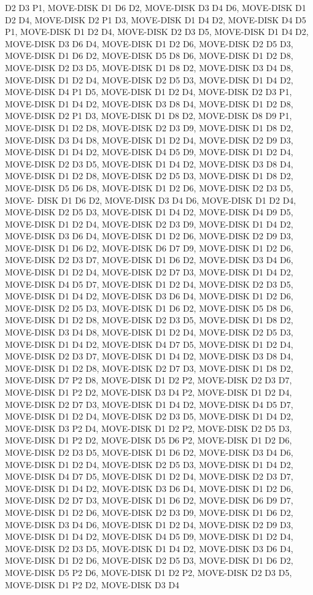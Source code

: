 \documentclass[12pt]{article}
\begin{document}
\begin{appendix}
\begin{itemize}
D2 D3 P1,  MOVE-DISK D1 D6 D2,  MOVE-DISK D3 D4 D6,  MOVE-DISK D1 D2 D4,  MOVE-DISK D2 P1 D3,  MOVE-DISK D1 D4 D2,  MOVE-DISK D4 D5 P1,  MOVE-DISK D1 D2 D4,  MOVE-DISK D2 D3 D5,  MOVE-DISK D1 D4 D2,  MOVE-DISK D3 D6 D4,  MOVE-DISK D1 D2 D6,  MOVE-DISK D2 D5 D3,  MOVE-DISK D1 D6 D2,  MOVE-DISK D5 D8 D6,  MOVE-DISK D1 D2 D8,  MOVE-DISK D2 D3 D5,  MOVE-DISK D1 D8 D2,  MOVE-DISK D3 D4 D8,  MOVE-DISK D1 D2 D4,  MOVE-DISK D2 D5 D3,  MOVE-DISK D1 D4 D2,  MOVE-DISK D4 P1 D5,  MOVE-DISK D1 D2 D4,  MOVE-DISK D2 D3 P1,  MOVE-DISK D1 D4 D2,  MOVE-DISK D3 D8 D4,  MOVE-DISK D1 D2 D8,  MOVE-DISK D2 P1 D3,  MOVE-DISK D1 D8 D2,  MOVE-DISK D8 D9 P1,  MOVE-DISK D1 D2 D8,  MOVE-DISK D2 D3 D9,  MOVE-DISK D1 D8 D2,  MOVE-DISK D3 D4 D8,  MOVE-DISK D1 D2 D4,  MOVE-DISK D2 D9 D3,  MOVE-DISK D1 D4 D2,  MOVE-DISK D4 D5 D9,  MOVE-DISK D1 D2 D4,  MOVE-DISK D2 D3 D5,  MOVE-DISK D1 D4 D2,  MOVE-DISK D3 D8 D4,  MOVE-DISK D1 D2 D8,  MOVE-DISK D2 D5 D3,  MOVE-DISK D1 D8 D2,  MOVE-DISK D5 D6 D8,  MOVE-DISK D1 D2 D6,  MOVE-DISK D2 D3 D5,  MOVE-
DISK D1 D6 D2,  MOVE-DISK D3 D4 D6,  MOVE-DISK D1 D2 D4,  MOVE-DISK D2 D5 D3,  MOVE-DISK D1 D4 D2,  MOVE-DISK D4 D9 D5,  MOVE-DISK D1 D2 D4,  MOVE-DISK D2 D3 D9,  MOVE-DISK D1 D4 D2,  MOVE-DISK D3 D6 D4,  MOVE-DISK D1 D2 D6,  MOVE-DISK D2 D9 D3,  MOVE-DISK D1 D6 D2,  MOVE-DISK D6 D7 D9,  MOVE-DISK D1 D2 D6,  MOVE-DISK D2 D3 D7,  MOVE-DISK D1 D6 D2,  MOVE-DISK D3 D4 D6,  MOVE-DISK D1 D2 D4,  MOVE-DISK D2 D7 D3,  MOVE-DISK D1 D4 D2,  MOVE-DISK D4 D5 D7,  MOVE-DISK D1 D2 D4,  MOVE-DISK D2 D3 D5,  MOVE-DISK D1 D4 D2,  MOVE-DISK D3 D6 D4,  MOVE-DISK D1 D2 D6,  MOVE-DISK D2 D5 D3,  MOVE-DISK D1 D6 D2,  MOVE-DISK D5 D8 D6,  MOVE-DISK D1 D2 D8,  MOVE-DISK D2 D3 D5,  MOVE-DISK D1 D8 D2,  MOVE-DISK D3 D4 D8,  MOVE-DISK D1 D2 D4,  MOVE-DISK D2 D5 D3,  MOVE-DISK D1 D4 D2,  MOVE-DISK D4 D7 D5,  MOVE-DISK D1 D2 D4,  MOVE-DISK D2 D3 D7,  MOVE-DISK D1 D4 D2,  MOVE-DISK D3 D8 D4,  MOVE-DISK D1 D2 D8,  MOVE-DISK D2 D7 D3,  MOVE-DISK D1 D8 D2,  MOVE-DISK D7 P2 D8,  MOVE-DISK D1 D2 P2,  MOVE-DISK D2 D3 D7,  MOVE-DISK D1 P2 D2,  
MOVE-DISK D3 D4 P2,  MOVE-DISK D1 D2 D4,  MOVE-DISK D2 D7 D3,  MOVE-DISK D1 D4 D2,  MOVE-DISK D4 D5 D7,  MOVE-DISK D1 D2 D4,  MOVE-DISK D2 D3 D5,  MOVE-DISK D1 D4 D2,  MOVE-DISK D3 P2 D4,  MOVE-DISK D1 D2 P2,  MOVE-DISK D2 D5 D3,  MOVE-DISK D1 P2 D2,  MOVE-DISK D5 D6 P2,  MOVE-DISK D1 D2 D6,  MOVE-DISK D2 D3 D5,  MOVE-DISK D1 D6 D2,  MOVE-DISK D3 D4 D6,  MOVE-DISK D1 D2 D4,  MOVE-DISK D2 D5 D3,  MOVE-DISK D1 D4 D2,  MOVE-DISK D4 D7 D5,  MOVE-DISK D1 D2 D4,  MOVE-DISK D2 D3 D7,  MOVE-DISK D1 D4 D2,  MOVE-DISK D3 D6 D4,  MOVE-DISK D1 D2 D6,  MOVE-DISK D2 D7 D3,  MOVE-DISK D1 D6 D2,  MOVE-DISK D6 D9 D7,  MOVE-DISK D1 D2 D6,  MOVE-DISK D2 D3 D9,  MOVE-DISK D1 D6 D2,  MOVE-DISK D3 D4 D6,  MOVE-DISK D1 D2 D4,  MOVE-DISK D2 D9 D3,  MOVE-DISK D1 D4 D2,  MOVE-DISK D4 D5 D9,  MOVE-DISK D1 D2 D4,  MOVE-DISK D2 D3 D5,  MOVE-DISK D1 D4 D2,  MOVE-DISK D3 D6 D4,  MOVE-DISK D1 D2 D6,  MOVE-DISK D2 D5 D3,  MOVE-DISK D1 D6 D2,  MOVE-DISK D5 P2 D6,  MOVE-DISK D1 D2 P2,  MOVE-DISK D2 D3 D5,  MOVE-DISK D1 P2 D2,  MOVE-DISK D3 D4 

\end{itemize}
\end{appendix}
\end{document}
